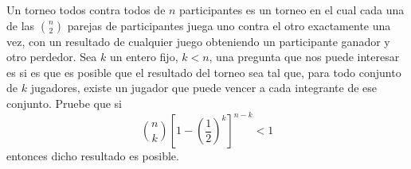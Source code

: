 \begin{statement}{8}
  Un torneo todos contra todos de $n$ participantes es un torneo en el cual
  cada una de las $\binom{n}{2}$ parejas de participantes juega uno contra el otro
  exactamente una vez, con un resultado de cualquier juego obteniendo un
  participante ganador y otro perdedor.
  Sea $k$ un entero fijo, $k < n$, una pregunta que nos puede interesar es si
  es que es posible que el resultado del torneo sea tal que, para todo conjunto
  de $k$ jugadores, existe un jugador que puede vencer a cada integrante de ese
  conjunto. Pruebe que si
  \[
    \binom{n}{k}\left[1 - \left(\frac{1}{2}\right)^k\right]^{n - k} < 1
  \]
  entonces dicho resultado es posible.
\end{statement}